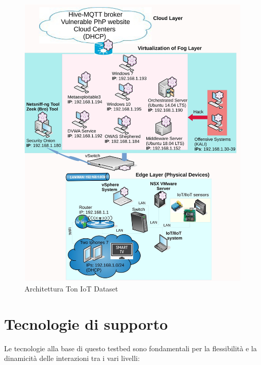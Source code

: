 \begin{figure}[htbp]
\centering
\includegraphics[scale= 0.7]{UNINA_MSc_Thesis_Project/img/Ton_Architecture.jpg}
  \caption{Architettura Ton IoT Dataset}
\end{figure}



\section{Tecnologie di supporto}

Le tecnologie alla base di questo testbed sono fondamentali per la flessibilità e la dinamicità delle interazioni tra i vari livelli:


